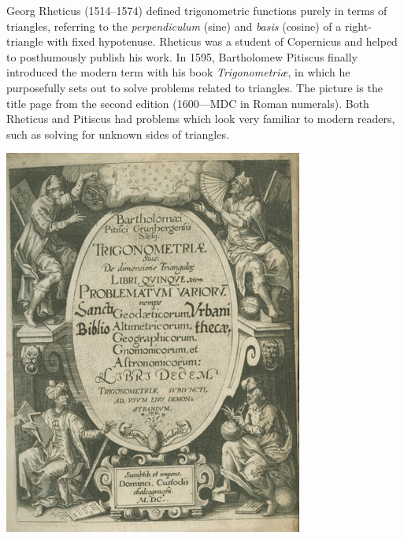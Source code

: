 \begin{minipage}[t]{0.67\linewidth}\vspace{0pt}

Georg Rheticus (1514--1574) defined trigonometric functions purely in terms of triangles, referring to the \emph{perpendiculum} (sine) and \emph{basis} (cosine) of a right-triangle with fixed hypotenuse. Rheticus was a student of Copernicus and helped to posthumously publish his work.\smallbreak
In 1595, Bartholomew Pitiscus finally introduced the modern term with his book \emph{Trigonometriæ}, in which he purposefully sets out to solve problems related to triangles. The picture is the title page from the second edition (1600---MDC in Roman numerals). Both Rheticus and Pitiscus had problems which look very familiar to modern readers, such as solving for unknown sides of triangles.
\end{minipage}\hfill\begin{minipage}[t]{0.32\linewidth}\vspace{-3pt}
\flushright\includegraphics[scale=0.38]{trigonometria}
\end{minipage}\par
\goodbreak



